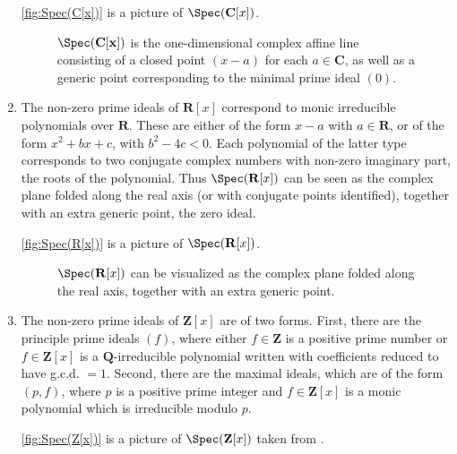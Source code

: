 \begin{solution}
\begin{enumerate}
\autoref{fig:Spec(C[x])} is a picture of \(\Spec(\mathbf{C}[x])\).

\begin{figure}
\centering

\caption{%
\(\Spec(\mathbf{C[x]})\) is the one-dimensional complex affine line consisting of a closed point \((x - a)\) for each \(a \in \mathbf{C}\), as well as a generic point corresponding to the minimal prime ideal \((0)\).%
}
\label{fig:Spec(C[x])}
\end{figure}

\item
The non-zero prime ideals of \(\mathbf R[x]\) correspond to monic irreducible polynomials over \(\mathbf R\).
These are either of the form \(x - a\) with \(a \in \mathbf R\), or of the form \(x^2 + bx + c\), with \(b^2 - 4c < 0\).
Each polynomial of the latter type corresponds to two conjugate complex numbers with non-zero imaginary part, the roots of the polynomial.
Thus \(\Spec(\mathbf R[x])\) can be seen as the complex plane folded along the real axis (or with conjugate points identified), together with an extra generic point, the zero ideal.

\autoref{fig:Spec(R[x])} is a picture of \(\Spec(\mathbf{R}[x])\).

\begin{figure}
\centering

\caption{%
\(\Spec(\mathbf{R}[x])\) can be visualized as the complex plane folded along the real axis, together with an extra generic point.%
}
\label{fig:Spec(R[x])}
\end{figure}

\item
The non-zero prime ideals of \(\mathbf{Z}[x]\) are of two forms.
First, there are the principle prime ideals \((f)\), where either \(f \in \mathbf{Z}\) is a positive prime number or \(f \in \mathbf{Z}[x]\) is a \(\mathbf{Q}\)-irreducible polynomial written with coefficients reduced to have g.c.d. \(= 1\).
Second, there are the maximal ideals, which are of the form \((p, f)\), where \(p\) is a positive prime integer and \(f \in \mathbf{Z}[x]\) is a monic polynomial which is irreducible modulo \(p\).

\autoref{fig:Spec(Z[x])} is a picture of \(\Spec(\mathbf{Z}[x])\) taken from \cite[Chapter~2, \S1, Example~H]{MumfordRedBook}.


\end{enumerate}
\end{solution}
